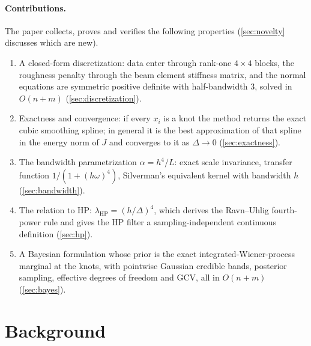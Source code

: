 \documentclass[11pt,a4paper]{article}
\theoremstyle{definition}
\theoremstyle{remark}
\begin{document}
\paragraph{Contributions.} The paper collects, proves and verifies the following properties (\cref{sec:novelty} discusses which are new).
\begin{enumerate}[label=\arabic*.]
\item A closed-form discretization: data enter through rank-one $4\times 4$ blocks, the roughness penalty through the beam element stiffness matrix, and the normal equations are symmetric positive definite with half-bandwidth $3$, solved in $O(n+m)$ (\cref{sec:discretization}).
\item Exactness and convergence: if every $x_i$ is a knot the method returns the exact cubic smoothing spline; in general it is the best approximation of that spline in the energy norm of $J$ and converges to it as $\Delta\to 0$ (\cref{sec:exactness}).
\item The bandwidth parametrization $\alpha=h^4/L$: exact scale invariance, transfer function $1/(1+(h\omega)^4)$, Silverman's equivalent kernel with bandwidth $h$ (\cref{sec:bandwidth}).
\item The relation to HP: $\lambda_{\mathrm{HP}}=(h/\Delta)^4$, which derives the Ravn--Uhlig fourth-power rule and gives the HP filter a sampling-independent continuous definition (\cref{sec:hp}).
\item A Bayesian formulation whose prior is the exact integrated-Wiener-process marginal at the knots, with pointwise Gaussian credible bands, posterior sampling, effective degrees of freedom and GCV, all in $O(n+m)$ (\cref{sec:bayes}).
\end{enumerate}

\section{Background}
\label{sec:background}
\end{document}

